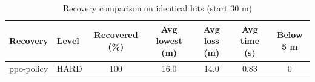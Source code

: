 \begin{table}[h]
\centering
\caption{Recovery comparison on identical hits (start 30 m)}
\begin{tabular}{llccccc}
\hline
Recovery & Level & Recovered (\%) & Avg lowest (m) & Avg loss (m) & Avg time (s) & Below 5 m \\
\hline
ppo-policy & HARD & 100 & 16.0 & 14.0 & 0.83 & 0 \\
\hline
\end{tabular}
\end{table}
